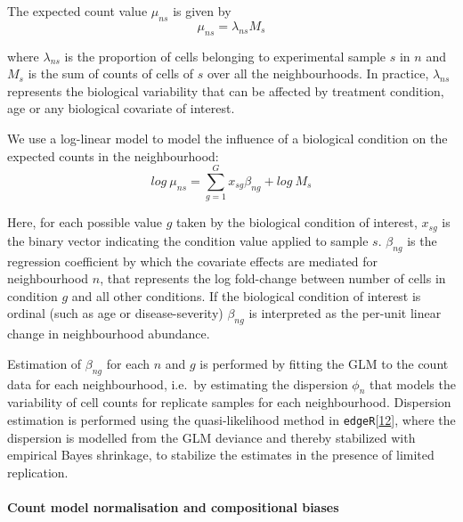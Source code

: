 \documentclass[
]{article}
\begin{document}
The expected count value \(\mu_{ns}\) is given by
\[
\mu_{ns} = \lambda_{ns}M_{s}
\]

where \(\lambda_{ns}\) is the proportion of cells belonging to experimental sample \(s\) in \(n\) and \(M_s\) is the sum of counts of cells of \(s\) over all the neighbourhoods. In practice, \(\lambda_{ns}\) represents the biological variability that can be affected by treatment condition, age or any biological covariate of interest.

We use a log-linear model to model the influence of a biological condition on the expected counts in the neighbourhood:
\begin{equation}
  \label{eq:1}
    log\ \mu_{ns} = \sum_{g=1}^{G}x_{sg}\beta_{ng} + log\ M_s
\end{equation}

Here, for each possible value \(g\) taken by the biological condition of interest, \(x_{sg}\) is the binary vector indicating the condition value applied to sample \(s\). \(\beta_{ng}\) is the regression coefficient by which the covariate effects are mediated for neighbourhood \(n\), that represents the log fold-change between number of cells in condition \(g\) and all other conditions. If the biological condition of interest is ordinal (such as age or disease-severity) \(\beta_{ng}\) is interpreted as the per-unit linear change in neighbourhood abundance.

Estimation of \(\beta_{ng}\) for each \(n\) and \(g\) is performed by fitting the GLM to the count data for each neighbourhood, i.e.~by estimating the dispersion \(\phi_{n}\) that models the variability of cell counts for replicate samples for each neighbourhood. Dispersion estimation is performed using the quasi-likelihood method in \texttt{edgeR}{[}\protect\hyperlink{ref-robinsonEdgeRBioconductorPackage2010a}{12}{]}, where the dispersion is modelled from the GLM deviance and thereby stabilized with empirical Bayes shrinkage, to stabilize the estimates in the presence of limited replication.

\hypertarget{count-model-normalisation-and-compositional-biases}{%
\paragraph*{Count model normalisation and compositional biases}\label{count-model-normalisation-and-compositional-biases}}
\end{document}
